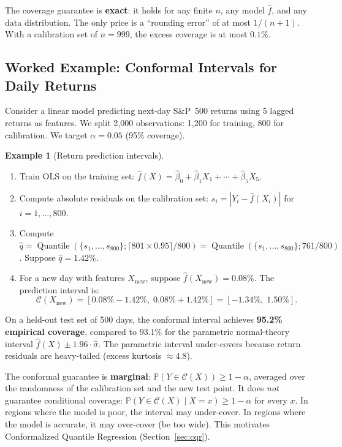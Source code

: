 \documentclass[11pt, a4paper]{article}
\theoremstyle{definition}
\newtheorem{example}{Example}[section]
\theoremstyle{plain}
\theoremstyle{remark}
\newcommand{\PV}{\mathbb{P}}
\newcommand{\Ccal}{\mathcal{C}}
\DeclareMathOperator{\Quantile}{Quantile}
\begin{document}
\begin{keyresult}
The coverage guarantee is \textbf{exact}: it holds for any finite $n$, any model
$\hat{f}$, and any data distribution.
The only price is a ``rounding error'' of at most $1/(n+1)$.
With a calibration set of $n = 999$, the excess coverage is at most $0.1\%$.
\end{keyresult}

\subsection{Worked Example: Conformal Intervals for Daily Returns}

Consider a linear model predicting next-day S\&P~500 returns using 5 lagged returns
as features.
We split 2{,}000 observations: 1{,}200 for training, 800 for calibration.
We target $\alpha = 0.05$ (95\% coverage).

\begin{example}[Return prediction intervals]\label{ex:return-intervals}
\begin{enumerate}
    \item Train OLS on the training set: $\hat{f}(X) = \hat{\beta}_0 +
          \hat{\beta}_1 X_1 + \cdots + \hat{\beta}_5 X_5$.
    \item Compute absolute residuals on the calibration set:
          $s_i = |Y_i - \hat{f}(X_i)|$ for $i = 1, \ldots, 800$.
    \item Compute $\hat{q} = \Quantile(\{s_1, \ldots, s_{800}\};
          \lceil 801 \times 0.95 \rceil / 800) = \Quantile(\{s_1, \ldots,
          s_{800}\}; 761/800)$.
          Suppose $\hat{q} = 1.42\%$.
    \item For a new day with features $X_{\mathrm{new}}$, suppose
          $\hat{f}(X_{\mathrm{new}}) = 0.08\%$.
          The prediction interval is:
          \[
              \Ccal(X_{\mathrm{new}}) = [0.08\% - 1.42\%,\; 0.08\% + 1.42\%]
              = [-1.34\%,\; 1.50\%].
          \]
\end{enumerate}
On a held-out test set of 500 days, the conformal interval achieves
\textbf{95.2\% empirical coverage}, compared to 93.1\% for the parametric
normal-theory interval $\hat{f}(X) \pm 1.96 \cdot \hat{\sigma}$.
The parametric interval under-covers because return residuals are
heavy-tailed (excess kurtosis $\approx 4.8$).
\end{example}

\begin{warningbox}
The conformal guarantee is \textbf{marginal}: $\PV(Y \in \Ccal(X)) \geq 1 - \alpha$,
averaged over the randomness of the calibration set and the new test point.
It does \emph{not} guarantee conditional coverage:
$\PV(Y \in \Ccal(X) \mid X = x) \geq 1 - \alpha$ for every $x$.
In regions where the model is poor, the interval may under-cover.
In regions where the model is accurate, it may over-cover (be too wide).
This motivates Conformalized Quantile Regression (Section~\ref{sec:cqr}).
\end{warningbox}
\end{document}
